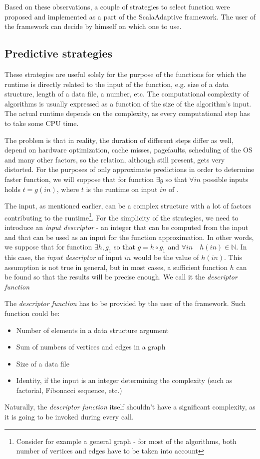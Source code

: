 Based on these observations, a couple of strategies to select function were proposed and implemented as a part of the ScalaAdaptive framework. The user of the framework can decide by himself on which one to use.

\subsection{Predictive strategies}

These strategies are useful solely for the purpose of the functions for which the runtime is directly related to the input of the function, e.g. size of a data structure, length of a data file, a number, etc. The computational complexity of algorithms is usually expressed as a function of the size of the algorithm's input. The actual runtime depends on the complexity, as every computational step has to take some CPU time. 

The problem is that in reality, the duration of different steps differ as well, depend on hardware optimization, cache misses, pagefaults, scheduling of the OS and many other factors, so the relation, although still present, gets very distorted. For the purposes of only approximate predictions in order to determine faster function, we will suppose that for function  \(\exists g\) so that 
\(\forall in\) possible inputs holds \(t = g(in)\), where \(t\) is the runtime on input \(in\) of .

The input, as mentioned earlier, can be a complex structure with a lot of factors contributing to the runtime\footnote{Consider for example a general graph - for most of the algorithms, both number of vertices and edges have to be taken into account}. For the simplicity of the strategies, we need to introduce an \textit{input descriptor} - an integer that can be computed from the input and that can be used as an input for the function approximation. In other words, we suppose that for function  \(\exists h, g_1\) so that
\(g = h \circ g_1\) 
and 
\(\forall in \quad h(in) \in \mathbb{N}\). In this case, the \textit{input descriptor} of input \(in\) would be the value of \(h(in)\).
This assumption is not true in general, but in most cases, a sufficient function \(h\) can be found so that the results will be precise enough. We call it the \textit{descriptor function}

The \textit{descriptor function} has to be provided by the user of the framework. %
Such function could be:
\begin{itemize}
	\item Number of elements in a data structure argument
	\item Sum of numbers of vertices and edges in a graph
	\item Size of a data file
	\item Identity, if the input is an integer determining the complexity (such as factorial, Fibonacci sequence, etc.)
\end{itemize}
Naturally, the \textit{descriptor function} itself shouldn't have a significant complexity, as it is going to be invoked during every call.

